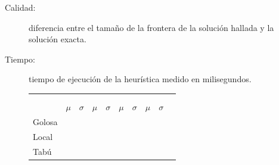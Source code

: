 \documentclass[a4paper, 10pt, twoside]{article}
\begin{document}
\begin{description}
	\item[Calidad:] diferencia entre el tamaño de la frontera de la solución hallada y la solución exacta.
	\item[Tiempo:] tiempo de ejecución de la heurística medido en milisegundos.
\end{description}



\begin{figure}[H]
	\begin{tabularx}{\textwidth}{ |>{\small}X| *9{ >{\small\centering}X|} }
		\hline
		 &
		 &
		\tabularnewline
		
		&
		 &
		 &
		 &
		\tabularnewline

		& $\mu$ & $\sigma$ & $\mu$ & $\sigma$ & $\mu$ & $\sigma$ & $\mu$ & $\sigma$
		\tabularnewline

		\hline
		Golosa &
		\golosaentrenamientocalidadmu &
		\golosaentrenamientocalidadsigma &
		\golosaentrenamientotiempomu &
		\golosaentrenamientotiemposigma &
		\golosatestingcalidadmu &
		\golosatestingcalidadsigma &
		\golosatestingtiempomu &
		\golosatestingtiemposigma
		\tabularnewline

		\hline
		Local &
		\localentrenamientocalidadmu &
		\localentrenamientocalidadsigma &
		\localentrenamientotiempomu &
		\localentrenamientotiemposigma &
		\localtestingcalidadmu &
		\localtestingcalidadsigma &
		\localtestingtiempomu &
		\localtestingtiemposigma
		\tabularnewline

		\hline
		Tabú &
		\tabuentrenamientocalidadmu &
		\tabuentrenamientocalidadsigma &
		\tabuentrenamientotiempomu &
		\tabuentrenamientotiemposigma &
		\tabutestingcalidadmu &
		\tabutestingcalidadsigma &
		\tabutestingtiempomu &
		\tabutestingtiemposigma
		\tabularnewline

		\hline
	\end{tabularx}
\end{figure}
\end{document}

